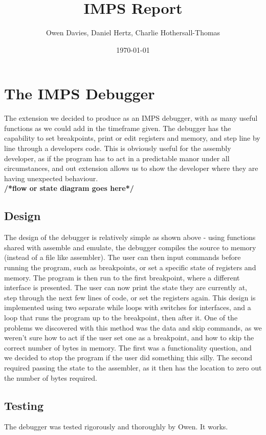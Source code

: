 \documentclass[a5=4paper,12pt]{article}
\begin{document}
\setlength{\topmargin}{-1cm} %
\title{IMPS Report}
\author{Owen Davies, Daniel Hertz, Charlie Hothersall-Thomas}
\date{ \today}

\maketitle
\section*{The IMPS Debugger} %
The extension we decided to produce as an IMPS debugger, with as many useful functions as we could add in the timeframe given. The debugger has the capability to set breakpoints, print or edit registers and memory, and step line by line through a developers code. This is obviously useful for the assembly developer, as if the program has to act in a predictable manor under all circumstances, and out extension allows us to show the developer where they are having unexpected behaviour. \\ %
\textbf{/*flow or state diagram goes here*/ }
\subsection*{Design}      
The design of the debugger is relatively simple as shown above - using functions shared with assemble and emulate, the debugger compiles the source to memory (instead of a file like assembler). The user can then input commands before running the program, such as breakpoints, or set a specific state of registers and memory. The program is then run to the first breakpoint, where a different interface is presented. The user can now print the state they are currently at, step through the next few lines of code, or set the registers again. This design is implemented using two separate while loops with switches for interfaces, and a loop that runs the program up to the breakpoint, then after it. One of the problems we discovered with this method was the data and skip commands, as we weren't sure how to act if the user set one as a breakpoint, and how to skip the correct number of bytes in memory. The first was a functionality question, and we decided to stop the program if the user did something this silly. The second required passing the state to the assembler, as it then has the location to zero out the number of bytes required.
\subsection*{Testing}
The debugger was tested rigorously and thoroughly by Owen. It works.
\end{document}
